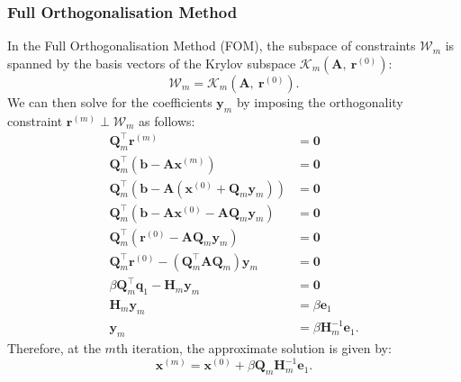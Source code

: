\documentclass{article}
\begin{document}
\subsubsection{Full Orthogonalisation Method}
In the Full Orthogonalisation Method (FOM), the subspace of constraints
\(\mathcal{W}_m\) is spanned by the basis vectors of the Krylov
subspace \(\mathcal{K}_m\left( \symbf{A},\: \symbf{r}^{\left( 0
\right)} \right)\):
\begin{equation*}
    \mathcal{W}_m = \mathcal{K}_m\left( \symbf{A},\: \symbf{r}^{\left( 0 \right)} \right).
\end{equation*}
We can then solve for the coefficients \(\symbf{y}_m\) by imposing the
orthogonality constraint \(\symbf{r}^{\left( m \right)} \perp \mathcal{W}_m\)
as follows:
\begin{align*}
    \symbf{Q}_m^\top \symbf{r}^{\left( m \right)}                                                                               & = \symbf{0}                           \\
    \symbf{Q}_m^\top \left( \symbf{b} - \symbf{A} \symbf{x}^{\left( m \right)} \right)                                          & = \symbf{0}                           \\
    \symbf{Q}_m^\top \left( \symbf{b} - \symbf{A} \left( \symbf{x}^{\left( 0 \right)} + \symbf{Q}_m \symbf{y}_m \right) \right) & = \symbf{0}                           \\
    \symbf{Q}_m^\top \left( \symbf{b} - \symbf{A} \symbf{x}^{\left( 0 \right)} - \symbf{A} \symbf{Q}_m \symbf{y}_m \right)      & = \symbf{0}                           \\
    \symbf{Q}_m^\top \left( \symbf{r}^{\left( 0 \right)} - \symbf{A} \symbf{Q}_m \symbf{y}_m \right)                            & = \symbf{0}                           \\
    \symbf{Q}_m^\top \symbf{r}^{\left( 0 \right)} - \left( \symbf{Q}_m^\top \symbf{A} \symbf{Q}_m \right) \symbf{y}_m           & = \symbf{0}                           \\
    \beta \symbf{Q}_m^\top \symbf{q}_1 - \symbf{H}_m \symbf{y}_m                                                                & = \symbf{0}                           \\
    \symbf{H}_m \symbf{y}_m                                                                                                     & = \beta \symbf{e}_1                   \\
    \symbf{y}_m                                                                                                                 & = \beta \symbf{H}_m^{-1} \symbf{e}_1.
\end{align*}
Therefore, at the \(m\)th iteration, the approximate solution is given by:
\begin{equation*}
    \symbf{x}^{\left( m \right)} = \symbf{x}^{\left( 0 \right)} + \beta \symbf{Q}_m \symbf{H}_m^{-1} \symbf{e}_1.
\end{equation*}
\end{document}
